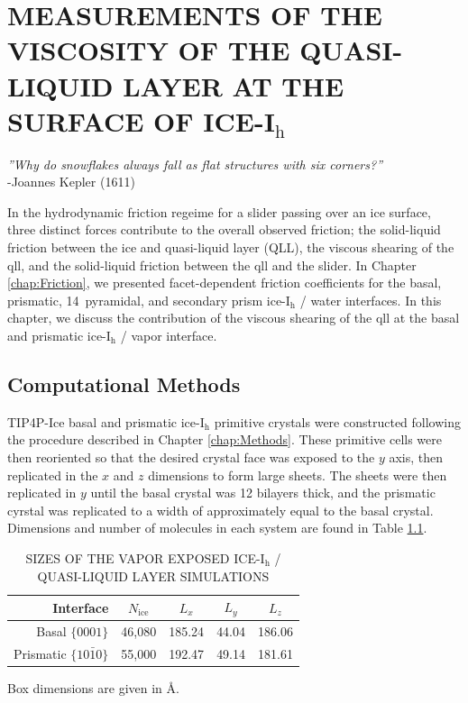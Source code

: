 \chapter{MEASUREMENTS OF THE VISCOSITY OF THE QUASI-LIQUID LAYER AT THE SURFACE OF ICE-I$_\mathrm{h}$}\label{chap:QLL}

\begin{flushright}
\textit{''Why do snowflakes always fall as flat structures with six corners?''} \\
-Joannes Kepler (1611) \\
\end{flushright}

In the hydrodynamic friction regeime for a slider passing over an ice surface, three distinct forces contribute to the overall observed friction; the solid-liquid friction between the ice and quasi-liquid layer (QLL), the viscous shearing of the qll, and the solid-liquid friction between the qll and the slider. In Chapter \ref{chap:Friction}, we presented facet-dependent friction coefficients for the basal, prismatic, 14\degree~pyramidal, and secondary prism ice-I$_\mathrm{h}$ / water interfaces. In this chapter, we discuss the contribution of the viscous shearing of the qll at the basal and prismatic ice-I$_\mathrm{h}$ / vapor interface.



\section{Computational Methods}
TIP4P-Ice basal and prismatic ice-I$_\mathrm{h}$ primitive crystals were constructed following the procedure described in Chapter \ref{chap:Methods}. These primitive cells were then reoriented so that the desired crystal face was exposed to the $y$ axis, then replicated in the $x$ and $z$ dimensions to form large sheets. The sheets were then replicated in $y$ until the basal crystal was 12 bilayers thick, and the prismatic cyrstal was replicated to a width of approximately equal to the basal crystal. Dimensions and number of molecules in each system are found in Table \ref{tab:qll-method}.


\begin{table}[h]
\centering
\caption{SIZES OF THE VAPOR EXPOSED ICE-I$_\mathrm{h}$ / QUASI-LIQUID LAYER SIMULATIONS\label{tab:qll-method}}
\begin{tabular}{r|c|ccc}
\hline
\hline
 Interface & $N_\mathrm{ice}$ & $L_x$ & $L_y$ & $L_z$ \\
\hline
Basal  $\{0001\}$                           & 46,080 & 185.24 & 44.04 & 186.06 \\
Prismatic  $\{10\bar{1}0\}$            & 55,000 & 192.47 & 49.14 & 181.61\\
\hline
\hline
\end{tabular}
\begin{flushleft}
Box dimensions are given in \AA.
\end{flushleft}
\end{table}


